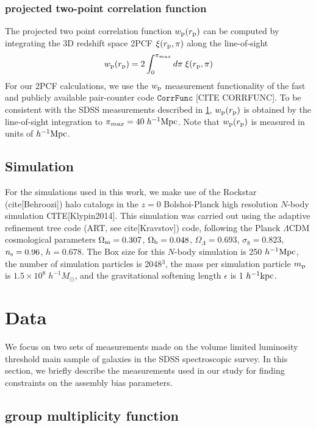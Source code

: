 \documentclass[14pt, preprint]{emulateapj}
\newcommand{\beq}{\begin{equation}}
\newcommand{\eeq}{\end{equation}}
\begin{document}
\subsubsection{projected two-point correlation function}
The projected two point correlation function $w_{\rm{p}}(r_{\rm{p}})$ can be computed by integrating the 3D redshift space 2PCF $\xi(r_{\rm{p}} , \pi)$ along the line-of-sight
\beq
w_{\rm{p}}(r_{\rm{p}}) = 2 \int_{0}^{\pi_{max}} d\pi \;\xi(r_{\rm{p}} , \pi)
\eeq
For our 2PCF calculations, we use the $w_{\rm p}$ measurement functionality of the fast and publicly available pair-counter code $\mathtt{CorrFunc}$ [CITE CORRFUNC].  To be consistent with the SDSS measurements described in \ref{sec:data}, $w_{\rm{p}}(r_{\rm{p}})$ is obtained by the line-of-sight integration to $\pi_{max}=40 \; h^{-1}\rm{Mpc}$. Note that $w_{\rm{p}}(r_{\rm{p}})$ is measured in units of $h^{-1}\rm{Mpc}$.

\subsection{Simulation}

For the simulations used in this work, we make use of the Rockstar (cite[Behroozi]) halo catalogs in the $z=0$ Bolshoi-Planck high 
resolution $N$-body simulation CITE[Klypin2014]. This simulation was carried out using the adaptive refinement tree code 
(ART, see cite[Kravstov]) code, following the Planck $\Lambda$CDM cosmological parameters 
$\Omega_{\rm m} = 0.307$, $\Omega_{\rm b} = 0.048$, $\Omega_{\Lambda} = 0.693$, $\sigma_{8} = 0.823$, $n_{\rm s}=0.96$, 
$h=0.678$. The Box size for this $N$-body simulation is 250 $h^{-1} \rm{Mpc}$, the number of simulation particles is 2048$^3$, 
the mass per simulation particle $m_{\rm p}$ is $1.5 \times 10^{8} \; h^{-1} M_{\odot}$, and the gravitational softening length 
$\epsilon$ is 1 $h^{-1} \rm{kpc}$. 

\section{Data}\label{sec:data}

We focus on two sets of measurements made on the volume limited luminosity threshold main sample of galaxies in the SDSS spectroscopic survey. In this section, we briefly describe the measurements used in our study for finding constraints on the assembly bias parameters.

\subsection{group multiplicity function}
\end{document}
